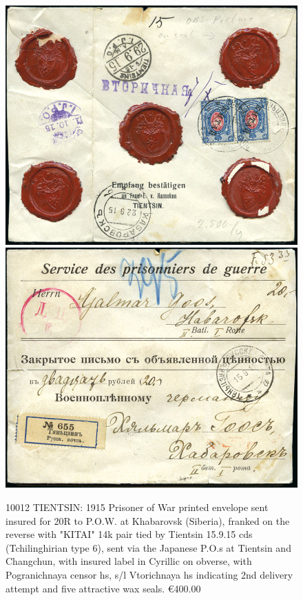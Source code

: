 \begin{figure}[htbp]
\centering
\includegraphics[width=.95\textwidth]{../russian-post-offices-in-china/10012.jpg}
\includegraphics[width=.95\textwidth]{../russian-post-offices-in-china/10012-1.jpg}
\caption{
10012	TIENTSIN: 1915 Prisoner of War printed envelope sent insured for 20R to P.O.W.
at Khabarovsk (Siberia), franked on the reverse with "KITAI" 14k pair tied by
Tientsin 15.9.15 cds (Tchilinghirian type 6), sent via the Japanese P.O.s at 
Tientsin and Changchun, with insured label in Cyrillic on obverse, with 
Pogranichnaya censor hs, s/l Vtorichnaya hs indicating 2nd delivery attempt
and five attractive wax seals.
\euro 400.00
}  
\end{figure}

